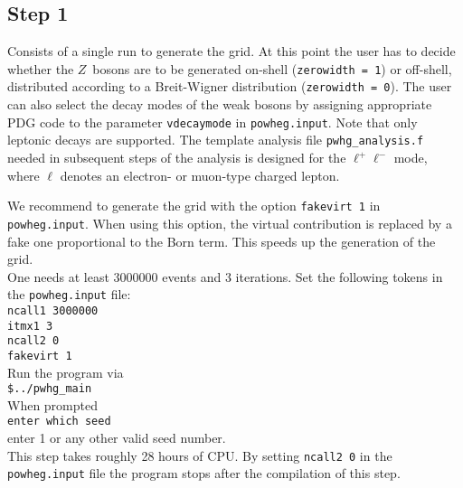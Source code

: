 \documentclass[a4paper,11pt]{article}
\begin{document}
\subsection*{Step 1}
%
Consists of a single run to generate the grid. At this point the user
has to decide whether the $Z$~bosons are to be generated on-shell
({\tt zerowidth = 1}) or off-shell, distributed according to a
Breit-Wigner distribution ({\tt zerowidth = 0}). 
The user can also select the decay modes of
the weak bosons by assigning appropriate PDG code to the parameter
{\tt vdecaymode} in {\tt powheg.input}. Note
that only leptonic decays are supported. The template analysis file
{\tt pwhg\_analysis.f} needed in subsequent steps of the analysis is
designed for the $\ell^+\ell^-$ mode, where $\ell$ denotes an electron- or muon-type charged lepton.

We recommend to generate the grid with the option {\tt fakevirt 1} in
{\tt powheg.input}. When using this option, the virtual contribution
is replaced by a fake one proportional to the Born term. This speeds
up the generation of the grid.
\\[2ex]
One needs at least 3000000 events and 3 iterations. Set the following
tokens in the {\tt powheg.input} file:
\\[2ex]
{\tt ncall1 3000000
  \\[2ex]
  itmx1 3
  \\[2ex]
  ncall2 0
  \\[2ex]
  fakevirt 1 }
\\[2ex]
Run the program via
\\[2ex]
{\tt \$../pwhg\_main}
\\[2ex]
When prompted
\\[2ex]
{\tt enter which seed}
\\[2ex]
enter 1 or any other valid seed number.
\\[2ex]
This step takes roughly 28 hours of CPU. By setting {\tt ncall2 0} in
the {\tt powheg.input} file the program stops after the compilation of
this step.

\end{document}
